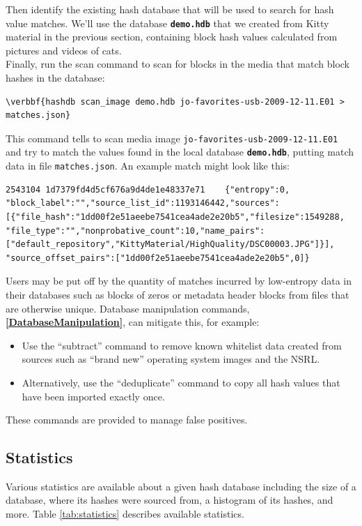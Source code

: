 \documentclass[11pt,fleqn]{article} %
\begin{document}
Then identify the existing hash database that will be used to search for hash value matches. We'll use the database \texttt{\textbf{demo.hdb}} that we created from Kitty material in the previous section, containing block hash values calculated from pictures and videos of cats.\\

Finally, run the \hdb scan command to scan for blocks in the media that match block hashes in the database:
\begin{Verbatim}[commandchars=\\\{\}]
\verbbf{hashdb scan_image demo.hdb jo-favorites-usb-2009-12-11.E01 > matches.json}
\end{Verbatim}
This command tells \hdb to scan media image \verb+jo-favorites-usb-2009-12-11.E01+ and try to match the values found in the local database \texttt{\textbf{demo.hdb}}, putting match data in file \verb+matches.json+.  An example match might look like this:

\begingroup
\footnotesize
\begin{Verbatim}[fontfamily=courier]
2543104	1d7379fd4d5cf676a9d4de1e48337e71	{"entropy":0,
"block_label":"","source_list_id":1193146442,"sources":
[{"file_hash":"1dd00f2e51aeebe7541cea4ade2e20b5","filesize":1549288,
"file_type":"","nonprobative_count":10,"name_pairs":
["default_repository","KittyMaterial/HighQuality/DSC00003.JPG"]}],
"source_offset_pairs":["1dd00f2e51aeebe7541cea4ade2e20b5",0]}
\end{Verbatim}
\endgroup


Users may be put off by the quantity of matches incurred by low-entropy data in their databases such as blocks of zeros or metadata header blocks from files that are otherwise unique. Database manipulation commands,
\textbf{\autoref{DatabaseManipulation}}, can mitigate this, for example:
\begin{itemize}
\item Use the ``subtract'' command to remove known whitelist data created from sources such as ``brand new'' operating system images and the NSRL.
\item Alternatively, use the ``deduplicate'' command to copy all hash values that have been imported exactly once.
\end{itemize}
These commands are provided to manage false positives.

\subsection{Statistics}
Various statistics are available about a given hash database including the size of a database, where its hashes were sourced from, a histogram of its hashes, and more.
Table \ref{tab:statistics} describes available statistics.\\
\end{document}
